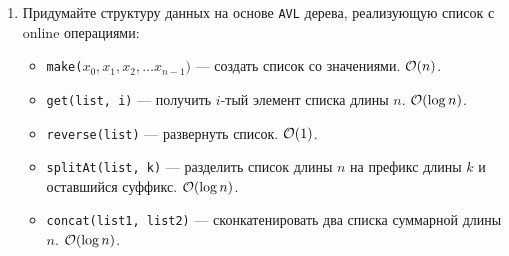 \begin{enumerate}
  \item
    Придумайте структуру данных на основе \texttt{AVL} дерева, реализующую список с online операциями:
    \begin{itemize}
      \item \texttt{make($x_0, x_1, x_2, \dots x_{n - 1})$} --- создать список со значениями. $\mathcal{O}(n)$.
      \item \texttt{get(list, i)} --- получить $i$-тый элемент списка длины $n$. $\mathcal{O}(\log{n})$.
      \item \texttt{reverse(list)} --- развернуть список. $\mathcal{O}(1)$.
      \item \texttt{splitAt(list, k)} --- разделить список длины $n$ на префикс длины $k$ и оставшийся суффикс. $\mathcal{O}(\log{n})$.
      \item \texttt{concat(list1, list2)} --- сконкатенировать два списка суммарной длины $n$. $\mathcal{O}(\log{n})$.
    \end{itemize}






\end{enumerate}